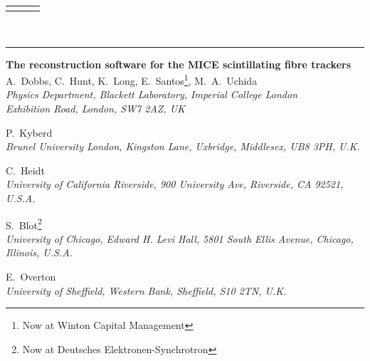 \thispagestyle{empty}

\begin{tabular}{p{} p{} p{}}
  \hspace{-0.8cm}\leftline{\today}                                 &
  \centering{Muon Ionization Cooling Experiment}                  &
  \rightline{}
\end{tabular}
\vspace{-1.0cm}\\
\rule{\textwidth}{0.43pt}

\begin{center}
  {\bf
    {\LARGE The reconstruction software for the MICE scintillating fibre trackers } \\
  }
  \vspace{0.2cm}
    A.~Dobbs, C.~Hunt, K.~Long, E.~Santos\footnote{Now at Winton Capital Management}, M.~A.~Uchida
  \\{\it
    Physics Department, Blackett Laboratory, Imperial College London \\
    Exhibition Road, London, SW7 2AZ, UK
  }
  \par 
  P.~Kyberd
  \\{\it
    Brunel University London, Kingston Lane, Uxbridge, Middlesex, UB8 3PH, U.K.
  } \\ 
  \par 
  C.~Heidt
  \\{\it
    University of California Riverside, 900 University Ave, Riverside, CA 92521, U.S.A. 
  }\\
  \par
  S.~Blot\footnote{Now at Deutsches Elektronen-Synchrotron}
  \\{\it
    University of Chicago, Edward H. Levi Hall, 5801 South Ellis Avenue, Chicago, Illinois, U.S.A. 
  }\\
  \par
  E.~Overton
  \\{\it
    University of Sheffield, Western Bank, Sheffield, S10 2TN, U.K. 
  }\\
  \par 
\end{center}
